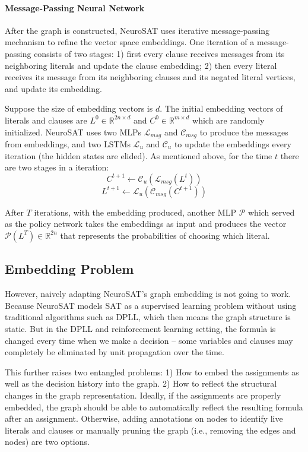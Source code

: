 \documentclass[sigplan,10pt]{acmart}\settopmatter{printfolios=true,printccs=false,printacmref=false}
\begin{document}
\paragraph{Message-Passing Neural Network}

After the graph is constructed, NeuroSAT uses iterative message-passing mechanism to refine the 
vector space embeddings.
One iteration of a message-passing consists of two stages:
1) first every clause receives messages from its neighboring literals and update the clause embedding;
2) then every literal receives its message from its neighboring clauses and its negated literal vertices,
and update its embedding.

Suppose the size of embedding vectors is $d$. The initial embedding vectors of literals and clauses 
are $L^{0} \in \mathbb{R}^{2n \times d}$ and $C^{0} \in \mathbb{R}^{m \times d}$ which are randomly initialized.
NeuroSAT uses two MLPs $\mathcal{L}_{msg}$ and $\mathcal{C}_{msg}$ to produce the messages from embeddings, 
and two LSTMs $\mathcal{L}_u$ and $\mathcal{C}_u$ to update the embeddings every iteration 
(the hidden states are elided). 
As mentioned above, for the time $t$ there are two stages in a iteration:
$$ C^{t+1} \leftarrow \mathcal{C}_u( \mathcal{L}_{msg}(L^t) ) $$
$$ L^{t+1} \leftarrow \mathcal{L}_u( \mathcal{C}_{msg}(C^{t+1}) ) $$

After $T$ iterations, with the embedding produced, another MLP $\mathcal{P}$ which served as the policy 
network takes the embeddings as input and produces the vector $\mathcal{P}(L^T) \in \mathbb{R}^{2n}$ that 
represents the probabilities of choosing which literal.

\subsection{Embedding Problem}

However, naively adapting NeuroSAT's graph embedding is not going to work.
Because NeuroSAT models SAT as a supervised learning problem without using traditional algorithms 
such as DPLL, which then means the graph structure is static. 
But in the DPLL and reinforcement learning setting, the formula is changed every time when we make a decision --
some variables and clauses may completely be eliminated by unit propagation over the time.

This further raises two entangled problems:
1) How to embed the assignments as well as the decision history into the graph.
2) How to reflect the structural changes in the graph representation. Ideally, if the assignments are properly 
embedded, the graph should be able to automatically reflect the resulting formula after an assignment. 
Otherwise, adding annotations on nodes to identify live literals and clauses or manually pruning the graph 
(i.e., removing the edges and nodes) are two options.
\end{document}

